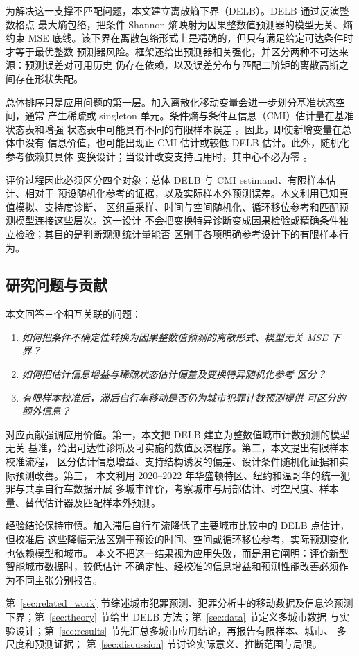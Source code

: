 为解决这一支撑不匹配问题，本文建立离散熵下界（DELB）。DELB 通过反演整数格点
最大熵包络，把条件 Shannon 熵映射为因果整数值预测器的模型无关、熵约束 MSE
底线。该下界在离散包络形式上是精确的，但只有满足给定可达条件时才等于最优整数
预测器风险。框架还给出预测器相关强化，并区分两种不可达来源：预测误差对可用历史
仍存在依赖，以及误差分布与匹配二阶矩的离散高斯之间存在形状失配。

总体排序只是应用问题的第一层。加入离散化移动变量会进一步划分基准状态空间，通常
产生稀疏或 singleton 单元。条件熵与条件互信息（CMI）估计量在基准状态表和增强
状态表中可能具有不同的有限样本误差
\citep{paninski2003,calcagnile2026benchmark}。因此，即使新增变量在总体中没有
信息价值，也可能出现正 CMI 估计或较低 DELB 估计。此外，随机化参考依赖其具体
变换设计；当设计改变支持占用时，其中心不必为零
\citep{ernst2004permutation,zan2022cmi,runge2018cmi,li2023nncit}。

评价过程因此必须区分四个对象：总体 DELB 与 CMI estimand、有限样本估计、相对于
预设随机化参考的证据，以及实际样本外预测误差。本文利用已知真值模拟、支持度诊断、
区组重采样、时间与空间随机化、循环移位参考和匹配预测模型连接这些层次。这一设计
不会把变换特异诊断变成因果检验或精确条件独立检验；其目的是判断观测统计量能否
区别于各项明确参考设计下的有限样本行为。

\subsection{研究问题与贡献}
\label{subsec:intro_contributions}

本文回答三个相互关联的问题：

\begin{enumerate}
    \item \textit{如何把条件不确定性转换为因果整数值预测的离散形式、模型无关
    MSE 下界？}
    \item \textit{如何把估计信息增益与稀疏状态估计偏差及变换特异随机化参考
    区分？}
    \item \textit{有限样本校准后，滞后自行车移动是否仍为城市犯罪计数预测提供
    可区分的额外信息？}
\end{enumerate}

对应贡献强调应用价值。第一，本文把 DELB 建立为整数值城市计数预测的模型无关
基准，给出可达性诊断及可实施的数值反演程序。第二，本文提出有限样本校准流程，
区分估计信息增益、支持结构诱发的偏差、设计条件随机化证据和实际预测改善。第三，
本文利用 2020--2022 年华盛顿特区、纽约和温哥华的统一犯罪与共享自行车数据开展
多城市评价，考察城市与局部估计、时空尺度、样本量、替代估计器及匹配样本外预测。

经验结论保持审慎。加入滞后自行车流降低了主要城市比较中的 DELB 点估计，但校准后
这些降幅无法区别于预设的时间、空间或循环移位参考，实际预测变化也依赖模型和城市。
本文不把这一结果视为应用失败，而是用它阐明：评价新型智能城市数据时，较低估计
不确定性、经校准的信息增益和预测性能改善必须作为不同主张分别报告。

第~\ref{sec:related_work} 节综述城市犯罪预测、犯罪分析中的移动数据及信息论预测
下界；第~\ref{sec:theory} 节给出 DELB 方法；第~\ref{sec:data} 节定义多城市数据
与实验设计；第~\ref{sec:results} 节先汇总多城市应用结论，再报告有限样本、城市、
多尺度和预测证据；
第~\ref{sec:discussion} 节讨论实际意义、推断范围与局限。

